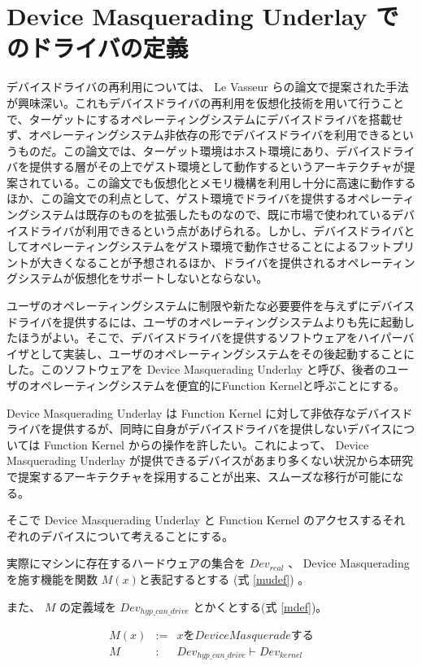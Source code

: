 \documentclass[a4paper,11pt,report]{ltjsbook}
\begin{document}
\section{Device Masquerading Underlay でのドライバの定義}

デバイスドライバの再利用については、 Le Vasseur らの論文\cite{reuse}で提案された手法が興味深い。これもデバイスドライバの再利用を仮想化技術を用いて行うことで、ターゲットにするオペレーティングシステムにデバイスドライバを搭載せず、オペレーティングシステム非依存の形でデバイスドライバを利用できるというものだ。この論文では、ターゲット環境はホスト環境にあり、デバイスドライバを提供する層がその上でゲスト環境として動作するというアーキテクチャが提案されている。この論文でも仮想化とメモリ機構を利用し十分に高速に動作するほか、この論文での利点として、ゲスト環境でドライバを提供するオペレーティングシステムは既存のものを拡張したものなので、既に市場で使われているデバイスドライバが利用できるという点があげられる。しかし、デバイスドライバとしてオペレーティングシステムをゲスト環境で動作させることによるフットプリントが大きくなることが予想されるほか、ドライバを提供されるオペレーティングシステムが仮想化をサポートしないとならない。

ユーザのオペレーティングシステムに制限や新たな必要要件を与えずにデバイスドライバを提供するには、ユーザのオペレーティングシステムよりも先に起動したほうがよい。そこで、デバイスドライバを提供するソフトウェアをハイパーバイザとして実装し、ユーザのオペレーティングシステムをその後起動することにした。このソフトウェアを Device Masquerading Underlay と呼び、後者のユーザのオペレーティングシステムを便宜的にFunction Kernelと呼ぶことにする。

Device Masquerading Underlay は Function Kernel に対して非依存なデバイスドライバを提供するが、同時に自身がデバイスドライバを提供しないデバイスについては Function Kernel からの操作を許したい。これによって、 Device Masquerading Underlay が提供できるデバイスがあまり多くない状況から本研究で提案するアーキテクチャを採用することが出来、スムーズな移行が可能になる。

そこで Device Masquerading Underlay と Function Kernel のアクセスするそれぞれのデバイスについて考えることにする。

実際にマシンに存在するハードウェアの集合を $ Dev_{real} $ 、 Device Masquerading を施す機能を関数 $ M(x) $と表記するとする (式 \ref{mudef}) 。

また、 $M$ の定義域を $ Dev_{hyp\_can\_drive} $ とかくとする(式 \ref{mdef})。

\begin{eqnarray}
M(x) & := & x を Device Masquerade する\label{mudef}\\
M & : & Dev_{hyp\_can\_drive} \vdash Dev_{kernel}\label{mdef}
\end{eqnarray}
\end{document}
